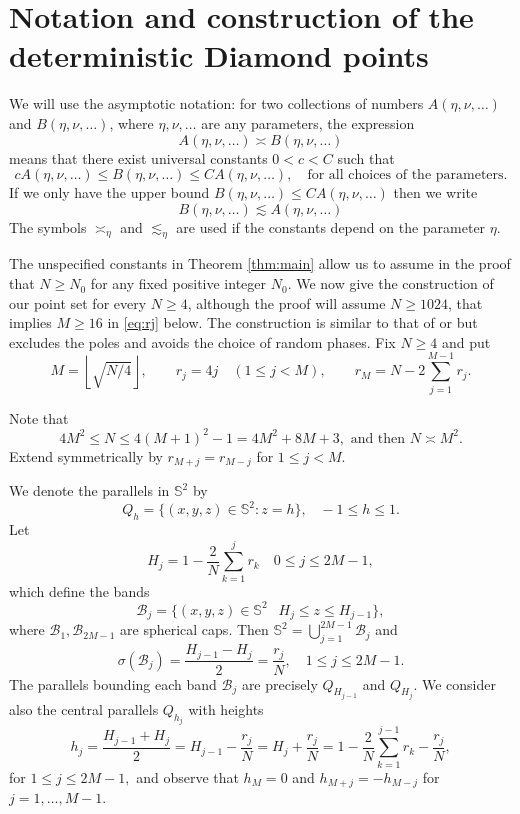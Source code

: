 \documentclass[11pt]{amsart}
\newcommand{\Sph}{\mathbb S^2}
\begin{document}
\section{Notation and construction of the deterministic Diamond points}
We will use the asymptotic notation: for two collections of numbers $A(\eta,\nu,\ldots)$ and $B(\eta,\nu,\ldots)$, where $\eta,\nu,\ldots$ are any parameters, the expression
\[
A(\eta,\nu,\ldots)\asymp B(\eta,\nu,\ldots)
\]
means that there exist universal constants $0<c<C$ such that
\[
c A(\eta,\nu,\ldots)\leq B(\eta,\nu,\ldots)\leq CA(\eta,\nu,\ldots),\quad \text{for all choices of the parameters.}
\]
If we only have  the upper bound $B(\eta,\nu,\ldots)\leq CA(\eta,\nu,\ldots)$ then we write
\[
B(\eta,\nu,\ldots)\lesssim A(\eta,\nu,\ldots)
\]
The symbols $\asymp_\eta$ and $\lesssim_\eta$ are used if the constants depend on the parameter $\eta$.


The  unspecified constants in Theorem \ref{thm:main} allow us to assume in the proof that $N\geq N_0$ for any fixed positive integer $N_0$. We now give the construction of our point set for every $N\geq4$, although the proof will assume $N\geq 1024$, that implies $M\geq16$ in \eqref{eq:rj} below.
The construction is similar to that of \cite[Section 4.1]{Diamond} or \cite[Section 3]{LG26} but excludes the poles and avoids the choice of random phases. Fix
$N\ge4$ and put
\begin{equation}\label{eq:rj}
 M=\left\lfloor\sqrt{N/4}\right\rfloor,\qquad
 r_j=4j\quad(1\le j<M),\qquad
 r_M=N-2\sum_{j=1}^{M-1}r_j .
\end{equation}

Note that
\[
4M^2\leq N\leq 4(M+1)^2-1=4M^2+8M+3,\text{ and then }N\asymp M^{2}.
\]
Extend symmetrically by $r_{M+j}=r_{M-j}$ for $1\le j<M$.

We denote the parallels in $\Sph$ by
$$Q_{h}=\{(x,y,z)\in \Sph : z=h \},\;\;\;-1\leq h \leq 1.$$
Let
\[
H_j=1-\frac{2}{N}\sum_{k=1}^j r_k\quad 0\leq j\leq 2M-1,
\]
which define the bands
$$\mathcal B_j=\{ (x,y,z)\in \Sph \;\:\; H_j\le z\le H_{j-1} \},$$
where $\mathcal B_1,\mathcal B_{2M-1}$ are spherical caps. Then $\Sph=\bigcup_{j=1}^{2M-1} \mathcal B_j$ and
\[
\sigma(\mathcal B_j)=\frac{H_{j-1}-H_j}{2}=\frac{r_j}{N},\quad 1\leq j\leq 2M-1.%
\]
The parallels bounding each band $\mathcal B_j$ are precisely $Q_{H_{j-1}}$ and $Q_{H_{j}}$. We consider also the central parallels $Q_{h_j}$ with heights
\[
h_j=\frac{H_{j-1}+H_j}{2}=H_{j-1}-\frac{r_j}{N}=H_{j}+\frac{r_j}{N}=1-\frac{2}{N}\sum_{k=1}^{j-1}
r_k
-\frac{r_j}{N},
\]
for $1\leq j\leq 2M-1,$ and observe that $h_M=0$ and $h_{M+j}=-h_{M-j}$ for $j=1,\dots, M-1.$
\end{document}
